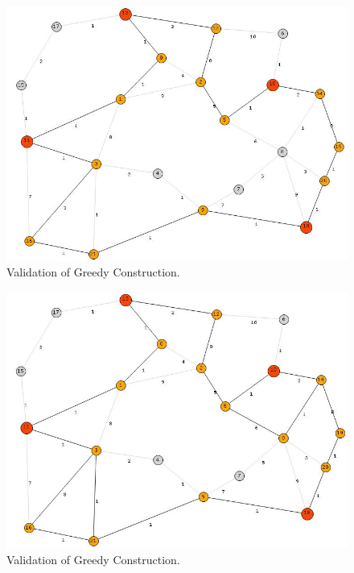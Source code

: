 \begin{figure}[H]
 \begin{center}
\includegraphics[scale=0.6]{18-2.jpg}
\caption{Validation of Greedy Construction. \label{fig:18b}}
 \end{center}
\end{figure}




\begin{figure}[H]
\begin{center}
\includegraphics[scale=0.6]{19.jpg}
\caption{Validation of Greedy Construction.}\label{fig:19}
\end{center} 
\end{figure}

